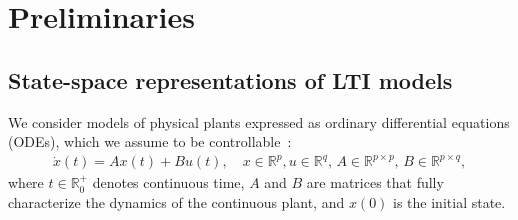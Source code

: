 \documentclass[sigconf]{llncs}
\newcommand{\mat}[1]{{#1}}
\renewcommand{\vec}[1]{{#1}}
\begin{document}
\section{Preliminaries}
\label{sec:preliminaries}

\subsection{State-space representations of LTI models}
\label{sec:model}


We consider models of physical plants expressed as ordinary differential
equations (ODEs), which we assume to be controllable~\cite{Astrom08,
astrom1997computer}:
%
\begin{align}
\label{eq:ode1}
\dot{x}(t) = \mat{A}\vec{x}(t)+ \mat{B} \vec{u}(t), \quad 
\vec{x} \in \mathbb{R}^p, \vec{u} \in \mathbb{R}^q,\,
\mat{A} \in \mathbb{R}^{p \times p},\,
\mat{B} \in \mathbb{R}^{p \times q},
\end{align}
%
where $t \in \mathbb R_0^+$ denotes continuous time, $\mat{A}$ and $\mat{B}$
are matrices that fully characterize the dynamics of the continuous plant,
and $x(0)$ is the initial state.
\end{document}
